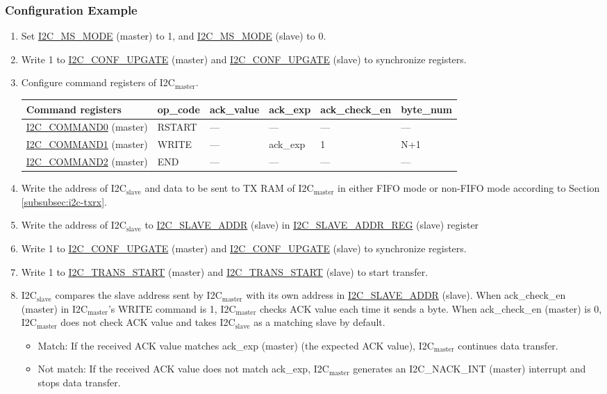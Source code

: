 \documentclass[main\_\_EN.tex]{subfiles}
\begin{document}
\subsubsection{Configuration Example}
\begin{enumerate}
\item Set \hyperref[fielddesc:I2CMSMODE]{I2C\_MS\_MODE} (master) to 1, and \hyperref[fielddesc:I2CMSMODE]{I2C\_MS\_MODE} (slave) to 0.
\item Write 1 to \hyperref[fielddesc:I2CCONFUPGATE]{I2C\_CONF\_UPGATE} (master) and \hyperref[fielddesc:I2CCONFUPGATE]{I2C\_CONF\_UPGATE} (slave) to synchronize registers.
\item Configure command registers of I2C$_\text{master}$.
\begin{longtable}{ | p{4cm} | p{2cm} | p{2cm} | p{2cm} |p{2cm} | p{2cm} |}
\hline\rowcolor{lightgray}
Command registers& op\_code & ack\_value&ack\_exp&ack\_check\_en&byte\_num  \\ \hline
\hyperref[fielddesc:I2CCOMMAND0]{I2C\_COMMAND0} (master)& RSTART& ---&---&---&---  \\ \hline
\hyperref[fielddesc:I2CCOMMAND1]{I2C\_COMMAND1} (master)& WRITE& ---&ack\_exp&1&N+1  \\ \hline
\hyperref[fielddesc:I2CCOMMAND2]{I2C\_COMMAND2} (master)& END& ---&---&---&---  \\ \hline
\end{longtable}
\item Write the address of I2C$_\text{slave}$ and data to be sent to TX RAM of I2C$_\text{master}$ in either FIFO mode or non-FIFO mode according to Section \ref{subsubsec:i2c-txrx}.
\item Write the address of I2C$_\text{slave}$ to \hyperref[fielddesc:I2CSLAVEADDR]{I2C\_SLAVE\_ADDR} (slave) in \hyperref[regdesc:I2CSLAVEADDRREG]{I2C\_SLAVE\_ADDR\_REG} (slave) register
\item Write 1 to \hyperref[fielddesc:I2CCONFUPGATE]{I2C\_CONF\_UPGATE} (master) and \hyperref[fielddesc:I2CCONFUPGATE]{I2C\_CONF\_UPGATE} (slave) to synchronize registers.
\item Write 1 to \hyperref[fielddesc:I2CTRANSSTART]{I2C\_TRANS\_START} (master) and \hyperref[fielddesc:I2CTRANSSTART]{I2C\_TRANS\_START} (slave) to start transfer.
\item I2C$_\text{slave}$ compares the slave address sent by I2C$_\text{master}$ with its own address in \hyperref[fielddesc:I2CSLAVEADDR]{I2C\_SLAVE\_ADDR} (slave). When ack\_check\_en (master) in I2C$_\text{master}$'s WRITE command is 1, I2C$_\text{master}$ checks ACK value each time it sends a byte. When ack\_check\_en (master) is 0, I2C$_\text{master}$ does not check ACK value and takes I2C$_\text{slave}$ as a matching slave by default.
\begin{itemize}
\item Match: If the received ACK value matches ack\_exp (master) (the expected ACK value), I2C$_\text{master}$ continues data transfer.
\item Not match: If the received ACK value does not match ack\_exp, I2C$_\text{master}$ generates an I2C\_NACK\_INT (master) interrupt and stops data transfer.
\end{itemize}


\end{enumerate}
\end{document}

